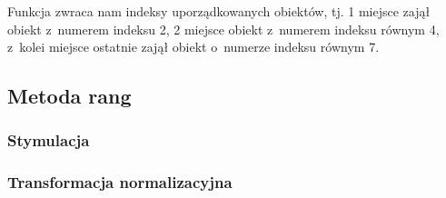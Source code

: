 \documentclass[12pt,a4paper]{report}
\begin{document}
{Funkcja zwraca nam indeksy uporządkowanych obiektów, tj. 1 miejsce
zajął obiekt z~numerem indeksu 2, 2 miejsce obiekt z~numerem indeksu
równym 4, z~kolei miejsce ostatnie zajął obiekt o~numerze indeksu równym
7.
\subsection{Metoda rang}
\subsubsection{Stymulacja} 
\begin{Shaded}
\begin{Highlighting}[]
\NormalTok{)} 
\end{Highlighting}
\end{Shaded}
\subsubsection{Transformacja normalizacyjna}
\begin{Shaded}
\begin{Highlighting}[]
\end{Highlighting}
\end{Shaded}
}
\end{document}
